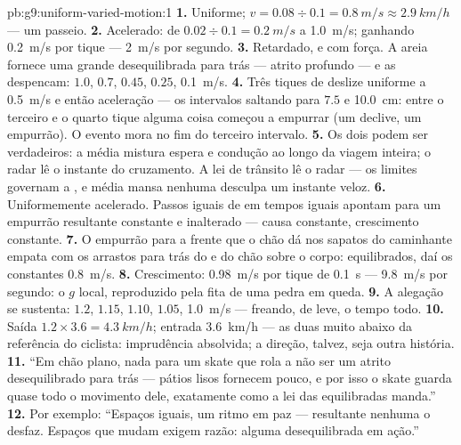 \begin{solution}{pb:g9:uniform-varied-motion:1}
\textbf{1.} Uniforme; $v = 0.08 \div 0.1 = \qty{0.8}{m/s} \approx
\qty{2.9}{km/h}$ --- um passeio.
\textbf{2.} Acelerado: de $0.02 \div 0.1 = \qty{0.2}{m/s}$ a
\qty{1.0}{m/s}; ganhando \qty{0.2}{m/s} por tique --- \qty{2}{m/s}
por segundo.
\textbf{3.} Retardado, e com força. A areia fornece uma grande 
desequilibrada para trás --- atrito profundo --- e as 
despencam: $1.0$, $0.7$, $0.45$, $0.25$, \qty{0.1}{m/s}.
\textbf{4.} Três tiques de deslize uniforme a \qty{0.5}{m/s} e então
aceleração --- os intervalos saltando para $7.5$ e \qty{10.0}{cm}:
entre o terceiro e o quarto tique alguma coisa começou a empurrar (um
declive, um empurrão). O evento mora no fim do terceiro intervalo.
\textbf{5.} Os dois podem ser verdadeiros: a média mistura espera e
condução ao longo da viagem inteira; o radar lê o instante do
cruzamento. A lei de trânsito lê o radar --- os limites governam a
, e média mansa nenhuma desculpa um instante
veloz.
\textbf{6.} Uniformemente acelerado. Passos iguais de  em
tempos iguais apontam para um empurrão resultante constante e
inalterado --- causa constante, crescimento constante.
\textbf{7.} O empurrão para a frente que o chão dá nos sapatos do
caminhante empata com os arrastos para trás do  e do chão sobre o
corpo: equilibrados, daí os constantes \qty{0.8}{m/s}.
\textbf{8.} Crescimento: \qty{0.98}{m/s} por tique de \qty{0.1}{s}
--- \qty{9.8}{m/s} por segundo: o $g$ local, reproduzido pela fita de
uma pedra em queda.
\textbf{9.} A alegação se sustenta:  $1.2$, $1.15$,
$1.10$, $1.05$, \qty{1.0}{m/s} --- freando, de leve, o tempo todo.
\textbf{10.} Saída $1.2 \times 3.6 = \qty{4.3}{km/h}$; entrada
\qty{3.6}{km/h} --- as duas muito abaixo da referência do ciclista:
imprudência absolvida; a direção, talvez, seja outra história.
\textbf{11.} ``Em chão plano, nada para um skate que rola a não ser
um atrito desequilibrado para trás --- pátios lisos fornecem pouco, e
por isso o skate guarda quase todo o movimento dele, exatamente como
a lei das  equilibradas manda.''
\textbf{12.} Por exemplo: ``Espaços iguais, um ritmo em paz ---
 resultante nenhuma o desfaz. Espaços que mudam exigem razão:
alguma  desequilibrada em ação.''
\end{solution}
